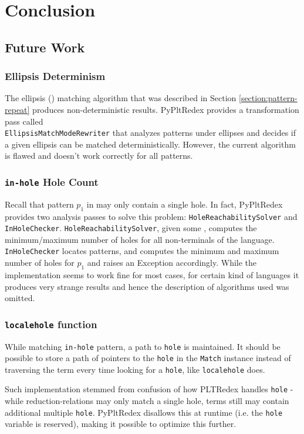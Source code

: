 \chapter{Conclusion}

\section{Future Work}
\subsection{Ellipsis Determinism}
The ellipsis (\RepeatNoArg) matching algorithm that was described in Section \ref{section:pattern-repeat} produces non-deterministic results. PyPltRedex provides a transformation pass called \\ \texttt{EllipsisMatchModeRewriter} that analyzes patterns under ellipses and decides if a given ellipsis can be matched deterministically. However, the current algorithm is flawed and doesn't work correctly for all patterns.

\subsection{\texttt{in-hole} Hole Count}
Recall that pattern $p_1$ in \PatternInHole \space may only contain a single hole. In fact, PyPltRedex provides two analysis passes to solve this problem: \texttt{HoleReachabilitySolver} and \texttt{InHoleChecker}. \texttt{HoleReachabilitySolver}, given some \DefineLanguageNoArg, computes the minimum/maximum number of holes for all non-terminals of the language. \texttt{InHoleChecker} locates \PatternInHoleNoArg patterns, and computes the minimum and maximum number of holes for $p_1$ and raises an Exception accordingly. While the implementation seems to work fine for most cases, for certain kind of languages it produces very strange results and hence the description of algorithms used was omitted.

\subsection{\texttt{localehole} function}
While matching \texttt{in-hole} pattern, a path to \texttt{hole} is maintained. It should be possible to store a path of pointers to the \texttt{hole} in the \texttt{Match} instance instead of traversing the term every time looking for a \texttt{hole}, like \texttt{localehole} does.

Such implementation stemmed from confusion of how PLTRedex handles \texttt{hole} - while reduction-relations may only match a single hole, terms still may contain additional multiple \texttt{hole}. PyPltRedex disallows this at runtime (i.e. the \texttt{hole} variable is reserved), making it possible to optimize this further.

